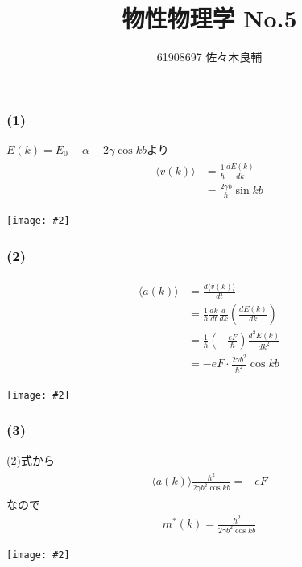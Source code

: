 \documentclass[uplatex,a4j,11pt,dvipdfmx]{jsarticle}
\makeatletter
\def\fgcaption{\def\@captype{figure}\caption}
\newcommand{\mfig}[3][width=15cm]{
\begin{center}
\texttt{[image: \#2]}
\fgcaption{#3 \label{fig:#2}}
\end{center}
}
\makeatother
\begin{document}
\title{物性物理学 No.5}
\author{61908697 佐々木良輔}
\date{}
\maketitle
\subsubsection*{(1)}
$E(k)=E_0-\alpha-2\gamma\cos kb$より
\begin{align}
  \begin{split}
    \langle v(k)\rangle&=\frac{1}{\hbar}\frac{d E(k)}{d k}\\
    &=\frac{2\gamma b}{\hbar}\sin kb
  \end{split}
\end{align}
\mfig[width=6cm]{fig/fig1.jpg}{$k$-$\langle v(k)\rangle$グラフ}
\subsubsection*{(2)}
\begin{align}
  \begin{split}
    \langle a(k)\rangle&=\frac{d\langle v(k)\rangle}{dt}\\
    &=\frac{1}{\hbar}\frac{dk}{dt}\frac{d}{dk}\left(\frac{dE(k)}{dk}\right)\\
    &=\frac{1}{\hbar}\left(-\frac{eF}{\hbar}\right)\frac{d^2E(k)}{dk^2}\\
    &=-eF\cdot\frac{2\gamma b^2}{\hbar^2}\cos kb
  \end{split}
\end{align}
\mfig[width=6cm]{fig/fig2.jpg}{$k$-$\langle a(k)\rangle$グラフ}
\subsubsection*{(3)}
(2)式から
\begin{align}
  \begin{split}
    \langle a(k)\rangle\frac{\hbar^2}{2\gamma b^2\cos kb}=-eF
  \end{split}
\end{align}
なので
\begin{align}
  m^*(k)=\frac{\hbar^2}{2\gamma b^2\cos kb}
\end{align}
\mfig[width=6cm]{fig/fig3.jpg}{$k$-$m^*$グラフ}
\end{document}
